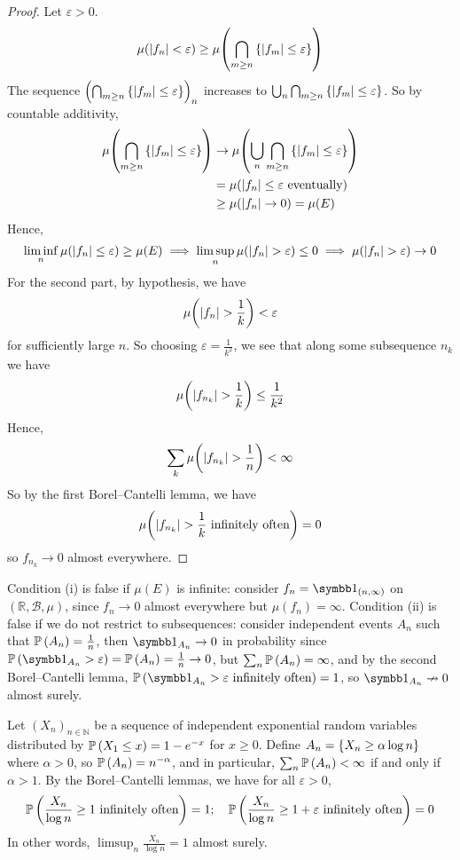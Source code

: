 \begin{proof}
	Let \( \varepsilon > 0 \).
	\[ \mu(\abs{f_n} < \varepsilon) \geq \mu\qty(\bigcap_{m \geq n} \qty{\abs{f_m} \leq \varepsilon}) \]
	The sequence \( \qty(\bigcap_{m \geq n} \qty{\abs{f_m} \leq \varepsilon})_n \) increases to \( \bigcup_n \bigcap_{m \geq n} \qty{\abs{f_m} \leq \varepsilon} \).
	So by countable additivity,
	\begin{align*}
		\mu\qty(\bigcap_{m \geq n} \qty{\abs{f_m} \leq \varepsilon}) &\to \mu\qty(\bigcup_n \bigcap_{m \geq n} \qty{\abs{f_m} \leq \varepsilon}) \\
		&= \mu\qty(\abs{f_n} \leq \varepsilon \text{ eventually}) \\
		&\geq \mu(\abs{f_n} \to 0) = \mu(E)
	\end{align*}
	Hence,
	\[ \liminf_n \mu(\abs{f_n} \leq \varepsilon) \geq \mu(E) \implies \limsup_n \mu(\abs{f_n} > \varepsilon) \leq 0 \implies \mu(\abs{f_n} > \varepsilon) \to 0 \]
	For the second part, by hypothesis, we have
	\[ \mu\qty(\abs{f_n} > \frac{1}{k}) < \varepsilon \]
	for sufficiently large \( n \).
	So choosing \( \varepsilon = \frac{1}{k^2} \), we see that along some subsequence \( n_k \) we have
	\[ \mu\qty(\abs{f_{n_k}} > \frac{1}{k}) \leq \frac{1}{k^2} \]
	Hence,
	\[ \sum_k \mu\qty(\abs{f_{n_k}} > \frac{1}{n}) < \infty \]
	So by the first Borel--Cantelli lemma, we have
	\[ \mu\qty(\abs{f_{n_k}} > \frac{1}{k} \text{ infinitely often}) = 0 \]
	so \( f_{n_k} \to 0 \) almost everywhere.
\end{proof}
\begin{remark}
	Condition (i) is false if \( \mu(E) \) is infinite: consider \( f_n = \symbb 1_{(n,\infty)} \) on \( (\mathbb R,\mathcal B,\mu) \), since \( f_n \to 0 \) almost everywhere but \( \mu(f_n) = \infty \).
	Condition (ii) is false if we do not restrict to subsequences: consider independent events \( A_n \) such that \( \mathbb{P}\left({A_n}\right) = \frac{1}{n} \), then \( \symbb 1_{A_n} \to 0 \) in probability since \( \prob{\symbb 1_{A_n} > \varepsilon} = \prob{A_n} = \frac{1}{n} \to 0 \), but \( \sum_n \mathbb{P}\left({A_n}\right) = \infty \), and by the second Borel--Cantelli lemma, \( \prob{\symbb 1_{A_n} > \varepsilon \text{ infinitely often}} = 1 \), so \( \symbb 1_{A_n} \nrightarrow 0 \) almost surely.
\end{remark}
\begin{example}
	Let \( (X_n)_{n \in \mathbb N} \) be a sequence of independent exponential random variables distributed by \( \mathbb{P}\left({X_1 \leq x}\right) = 1 - e^{-x} \) for \( x \geq 0 \).
	Define \( A_n = \qty{X_n \geq \alpha \log n} \) where \( \alpha > 0 \), so \( \mathbb{P}\left({A_n}\right) = n^{-\alpha} \), and in particular, \( \sum_n \mathbb{P}\left({A_n}\right) < \infty \) if and only if \( \alpha > 1 \).
	By the Borel--Cantelli lemmas, we have for all \( \varepsilon > 0 \),
	\[ \mathbb{P}\left({\frac{X_n}{\log n} \geq 1 \text{ infinitely often}}\right) = 1;\quad \mathbb{P}\left({\frac{X_n}{\log n} \geq 1 + \varepsilon \text{ infinitely often}}\right) = 0 \]
	In other words, \( \limsup_n \frac{X_n}{\log n} = 1 \) almost surely.
\end{example}

